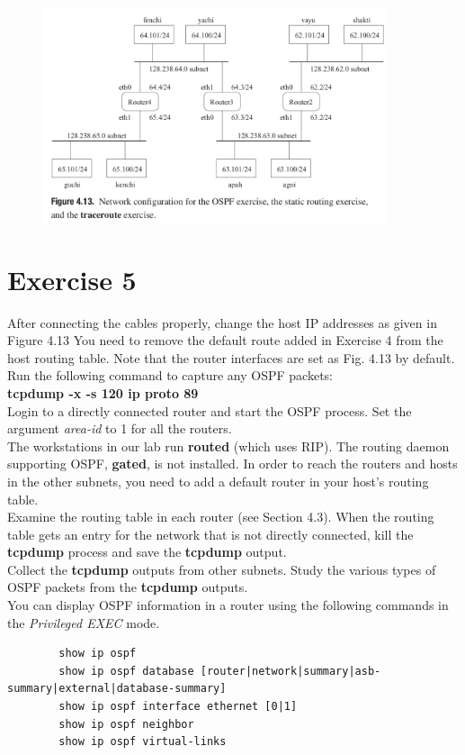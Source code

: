 \documentclass[10pt,a4paper]{article}
\numberwithin{equation}{section}
\numberwithin{figure}{section}
\numberwithin{table}{section}
\begin{document}
    \begin{figure}[H]
        \centering
        \includegraphics[width=0.9\textwidth]{img/figure4-13.png}
    \end{figure}

    \section{Exercise 5}
    After connecting the cables properly, change the host IP addresses as given in Figure 4.13 You need to remove the default route added in Exercise 4 from the host routing table.
    Note that the router interfaces are set as Fig. 4.13 by default. \\
    Run the following command to capture any OSPF packets: \\
    \textbf{tcpdump -x -s 120 ip proto 89} \\
    Login to a directly connected router and start the OSPF process.
    Set the argument \textit{area-id} to 1 for all the routers. \\
    The workstations in our lab run \textbf{routed} (which uses RIP).
    The routing daemon supporting OSPF, \textbf{gated}, is not installed.
    In order to reach the routers and hosts in the other subnets, you need to add a default router in your host’s routing table. \\
    Examine the routing table in each router (see Section 4.3).
    When the routing table gets an entry for the network that is not directly connected, kill the \textbf{tcpdump} process and save the \textbf{tcpdump} output. \\
    Collect the \textbf{tcpdump} outputs from other subnets.
    Study the various types of OSPF packets from the \textbf{tcpdump} outputs. \\
    You can display OSPF information in a router using the following commands in the \textit{Privileged EXEC} mode.
    \begin{verbatim}
        show ip ospf
        show ip ospf database [router|network|summary|asb-summary|external|database-summary]
        show ip ospf interface ethernet [0|1]
        show ip ospf neighbor
        show ip ospf virtual-links
    \end{verbatim}
\end{document}
